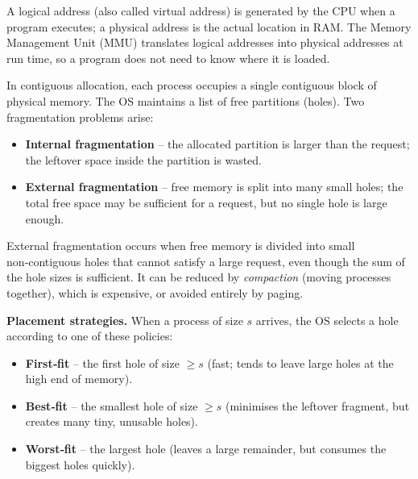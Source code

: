 \documentclass[11pt]{article}
\newcommand{\cle}[1]{{\popxbold\color{popdark}#1}}
\newcounter{popsec}
\newcounter{popsub}
\newcommand{\courssub}[1]{%
  \stepcounter{popsub}%
  \par\vspace{9pt}\noindent{\popxbold\fontsize{11.5}{13}\selectfont\color{popink}{\color{poporange}\thepopsec.\thepopsub}\hspace{6pt}#1}\par\nopagebreak\vspace{4pt}
}
\begin{document}
\courssub{Memory Management}

\begin{definition}
A \cle{logical address} (also called virtual address) is generated by the CPU when a program executes; a \cle{physical address} is the actual location in RAM.  The Memory Management Unit (MMU) translates logical addresses into physical addresses at run time, so a program does not need to know where it is loaded.
\end{definition}

In \cle{contiguous allocation}, each process occupies a single contiguous block of physical memory.  The OS maintains a list of free \cle{partitions} (holes).  Two fragmentation problems arise:
\begin{itemize}
  \item \textbf{Internal fragmentation} – the allocated partition is larger than the request; the leftover space inside the partition is wasted.
  \item \textbf{External fragmentation} – free memory is split into many small holes; the total free space may be sufficient for a request, but no single hole is large enough.
\end{itemize}

\begin{definition}
\cle{External fragmentation} occurs when free memory is divided into small non‑contiguous holes that cannot satisfy a large request, even though the sum of the hole sizes is sufficient.  It can be reduced by \emph{compaction} (moving processes together), which is expensive, or avoided entirely by paging.
\end{definition}

\textbf{Placement strategies.}  When a process of size $s$ arrives, the OS selects a hole according to one of these policies:
\begin{itemize}
  \item \textbf{First‑fit} – the first hole of size $\ge s$ (fast; tends to leave large holes at the high end of memory).
  \item \textbf{Best‑fit} – the smallest hole of size $\ge s$ (minimises the leftover fragment, but creates many tiny, unusable holes).
  \item \textbf{Worst‑fit} – the largest hole (leaves a large remainder, but consumes the biggest holes quickly).
\end{itemize}
\end{document}
